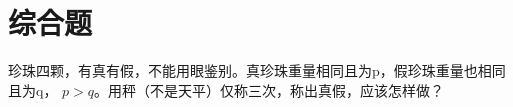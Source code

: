 \chapter{综合题}

\begin{Ex}
  珍珠四颗，有真有假，不能用眼鉴别。真珍珠重量相同且为p，假珍珠重量也相同且为q，
  $p > q$。用秤（不是天平）仅称三次，称出真假，应该怎样做？
\end{Ex}